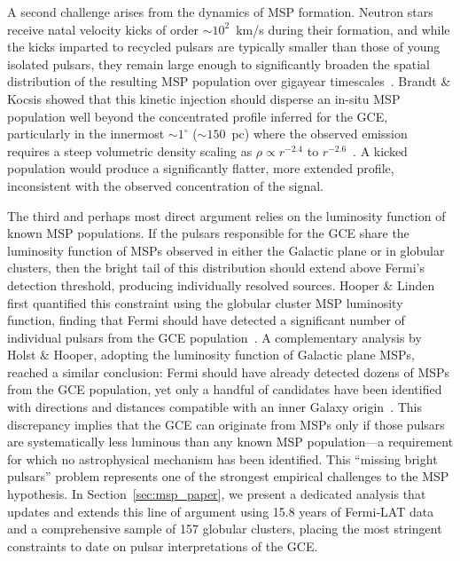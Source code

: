 A second challenge arises from the dynamics of MSP formation.
Neutron stars receive natal velocity kicks of order $\sim 10^2$~km/s during their formation, and while the kicks imparted to recycled pulsars are typically smaller than those of young isolated pulsars, they remain large enough to significantly broaden the spatial distribution of the resulting MSP population over gigayear timescales~\cite{Brandt:2015ula}.
Brandt \& Kocsis showed that this kinetic injection should disperse an in-situ MSP population well beyond the concentrated profile inferred for the GCE, particularly in the innermost $\sim 1^\circ$ ($\sim 150$~pc) where the observed emission requires a steep volumetric density scaling as $\rho \propto r^{-2.4}$ to $r^{-2.6}$~\cite{Brandt:2015ula}.
A kicked population would produce a significantly flatter, more extended profile, inconsistent with the observed concentration of the signal.

The third and perhaps most direct argument relies on the luminosity function of known MSP populations.
If the pulsars responsible for the GCE share the luminosity function of MSPs observed in either the Galactic plane or in globular clusters, then the bright tail of this distribution should extend above Fermi's detection threshold, producing individually resolved sources.
Hooper \& Linden first quantified this constraint using the globular cluster MSP luminosity function, finding that Fermi should have detected a significant number of individual pulsars from the GCE population~\cite{Hooper:2016rap}.
A complementary analysis by Holst \& Hooper, adopting the luminosity function of Galactic plane MSPs, reached a similar conclusion: Fermi should have already detected dozens of MSPs from the GCE population, yet only a handful of candidates have been identified with directions and distances compatible with an inner Galaxy origin~\cite{Holst:2024fvb}.
This discrepancy implies that the GCE can originate from MSPs only if those pulsars are systematically less luminous than any known MSP population---a requirement for which no astrophysical mechanism has been identified.
This ``missing bright pulsars'' problem represents one of the strongest empirical challenges to the MSP hypothesis.
In Section~\ref{sec:msp_paper}, we present a dedicated analysis that updates and extends this line of argument using 15.8 years of Fermi-LAT data and a comprehensive sample of 157 globular clusters, placing the most stringent constraints to date on pulsar interpretations of the GCE.
